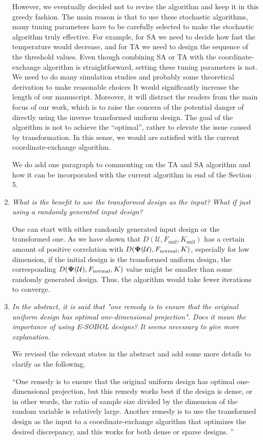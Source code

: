 \documentclass[12pt]{article}
\theoremstyle{definition}
\newcommand{\vPsi}{\boldsymbol{\Psi}}
\newcommand{\Udes}{\mathcal{U}}
\newcommand{\normal}{\textup{normal}}
\begin{document}
\begin{enumerate}
However, we eventually decided not to revise the algorithm and keep it in this greedy fashion. 
The main reason is that to use these stochastic algorithms, many tuning parameters have to be carefully selected to make the stochastic algorithm truly effective. 
For example, for SA we need to decide how fast the temperature would decrease, and for TA we need to design the sequence of the threshold values. 
Even though combining SA or TA with the coordinate-exchange algorithm is straightforward, setting these tuning parameters is not. 
We need to do many simulation studies and probably some theoretical derivation to make reasonable choices
It would significantly increase the length of our manuscript. 
Moreover, it will distract the readers from the main focus of our work, which is to raise the concern of the potential danger of directly using the inverse transformed uniform design. 
The goal of the algorithm is not to achieve the ``optimal'', rather to elevate the issue caused by transformation. 
In this sense, we would are satisfied with the current coordinate-exchange algorithm. 


We do add one paragraph to commenting on the TA and SA algorithm and how it can be incorporated with the current algorithm in end of the Section 5. 


\item
\emph{What is the benefit to use the transformed design as the input? What if just using a randomly generated input design?}

One can start with either randomly generated input design or the transformed one. 
As we have shown that $D(\mathcal{U}, F_{\textrm{unif}}, K_{\textrm{unif}})$ has a certain amount of positive correlation with $D(\vPsi(\Udes),F_\normal, K)$, especially for low dimension, if the initial design is the transformed uniform design, the corresponding $D(\vPsi(\Udes),F_\normal, K)$ value might be smaller than some randomly generated design. 
Thus, the algorithm would take fewer iterations to converge. 

\item \emph{In the abstract, it is said that "one remedy is to ensure that the original uniform design has optimal one-dimensional projection". Does it mean the importance of using E-SOBOL designs? It seems necessary to give more explanation.}

We revised the relevant states in the abstract and add some more details to clarify as the following. 

``One remedy is to ensure that the original uniform design has optimal one-dimensional projection, but this remedy works best if the design is dense, or in other words, the ratio of sample size divided by the dimension of the random variable is relatively large. 
Another remedy is to use the transformed design as the input to a coordinate-exchange algorithm that optimizes the desired discrepancy, and this works for both dense or sparse designs. ''


\end{enumerate}
\end{document}
